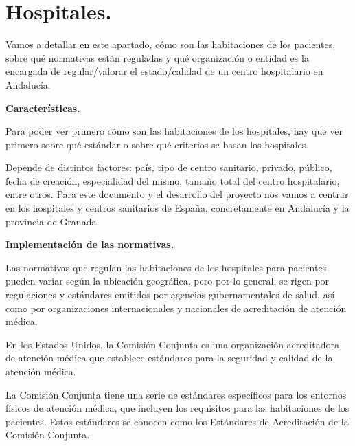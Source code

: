 

\newpage

\section{Hospitales.}

    Vamos a detallar en este apartado, cómo son las habitaciones de los pacientes, sobre qué normativas están reguladas y qué organización o entidad es la encargada de regular/valorar el estado/calidad de un centro hospitalario en Andalucía.
    
    \vskip 0.2in
    {\large \textbf{Características.}}
    \vskip 0.2in
    
    Para poder ver primero cómo son las habitaciones de los hospitales, hay que ver primero sobre qué estándar o sobre qué criterios se basan los hospitales. 
    
    Depende de distintos factores: país, tipo de centro sanitario, privado, público, fecha de creación, especialidad del mismo, tamaño total del centro hospitalario, entre otros. Para este documento y el desarrollo del proyecto nos vamos a centrar en los hospitales y centros sanitarios de España, concretamente en Andalucía y la provincia de Granada.

    \vskip 0.2in
    {\large \textbf{Implementación de las normativas.}}
    \vskip 0.2in

    Las normativas que regulan las habitaciones de los hospitales para pacientes pueden variar según la ubicación geográfica, pero por lo general, se rigen por regulaciones y estándares emitidos por agencias gubernamentales de salud, así como por organizaciones internacionales y nacionales de acreditación de atención médica.
    
    \vskip 0.1in

    En los Estados Unidos, la Comisión Conjunta es una organización acreditadora de atención médica que establece estándares para la seguridad y calidad de la 
    atención médica. 

    \vskip 0.1in
    
    La Comisión Conjunta tiene una serie de estándares específicos para los entornos físicos de atención médica, que incluyen los requisitos para las habitaciones de los pacientes. Estos estándares se conocen como los Estándares de Acreditación de la Comisión Conjunta.

